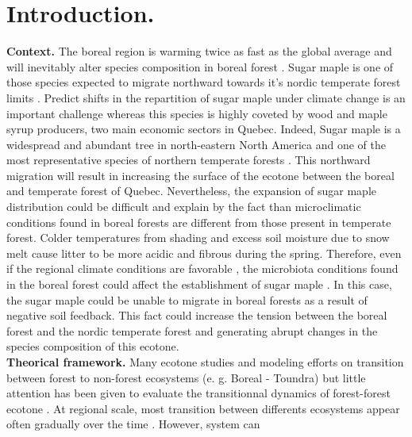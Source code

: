 


\newpage
\setcounter{page}{1}

\section{Introduction.}

\textbf{Context.} The boreal region is warming twice as fast as the global average and will inevitably alter species composition in boreal forest \cite{Scheffer2012,Hughes2000}.  Sugar maple is one of those species expected to migrate northward towards it's nordic temperate forest limits \cite{McKENNEY2007,Goldblum2005}. Predict shifts in the repartition of sugar maple under climate change is an important challenge whereas this species is highly coveted by wood and maple syrup producers, two main economic sectors in Quebec. Indeed, Sugar maple is a widespread and abundant tree in north-eastern North America and one of the most representative species of northern temperate forests \cite{Graignic2013,Messaoud2007,Kellman2004}. This northward migration will result in increasing the surface of the ecotone between the boreal and temperate forest of Quebec. Nevertheless, the expansion of sugar maple distribution could be difficult and explain by the fact than microclimatic conditions found in boreal forests are different from those present in temperate forest. Colder temperatures from shading and excess soil moisture due to snow melt cause litter to be more acidic and fibrous during the spring. Therefore, even if the regional climate conditions are favorable \cite{Kellman2004}, the microbiota conditions found in the boreal forest could affect the establishment of sugar maple \cite{Kellman2004,Moore2008,DeFrenne2013}. In this case, the sugar maple could be unable to migrate in boreal forests as a result of negative soil feedback. This fact could increase the tension between the boreal forest and the nordic temperate forest and generating abrupt changes in the species composition of this ecotone.\\

\textbf{Theorical framework.} Many ecotone studies and modeling efforts on transition between forest to non-forest ecosystems (e. g. Boreal - Toundra) \cite{Scheffer2012,Scheffer2001,Hirota2011} but little attention has been given to evaluate the transitionnal dynamics of forest-forest ecotone \cite{Goldblum2010,Graignic2013}. At regional scale, most transition between differents ecosystems appear often gradually over the time \cite{Scheffer2001,scheffer2009critical}. However, system can \\

